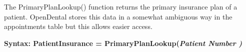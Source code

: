\documentclass[10pt,a4paper]{article}
\begin{document}
\begin{description}
\begin{center}
The PrimaryPlanLookup() function returns the primary insurance plan of a patient. OpenDental stores this data in a somewhat ambiguous way in the appointments table but this allows easier access. 


\bf Syntax: PatientInsurance = PrimaryPlanLookup(\it Patient Number \it ) 
\end{center} 

\end{description}
\end{document}
